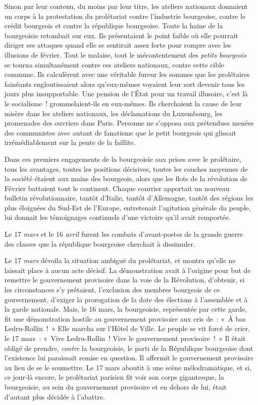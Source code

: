 \documentclass[french,twoside]{book} %
\begin{document}
Sinon par leur contenu, du moins par leur titre, les ateliers nationaux donnaient un corps à la protestation du prolétariat contre l’industrie bourgeoise, contre le crédit bourgeois et contre la république bourgeoise. Toute la haine de la bourgeoisie retombait sur eux. Ils présentaient le point faible où elle pourrait diriger ses attaques quand elle se sentirait assez forte pour rompre avec les illusions de février. Tout le malaise, tout le mécontentement des \emph{petits bourgeois} se tourna simultanément contre ces ateliers nationaux, contre cette cible commune. Ils calculèrent avec une véritable fureur les sommes que les prolétaires fainéants engloutissaient alors qu’eux-mêmes voyaient leur sort devenir tous les jours plus insupportable. Une pension de l’État pour un travail illusoire, c’est là le socialisme ! grommelaient-ils en eux-mêmes. Ils cherchaient la cause de leur misère dans les ateliers nationaux, les déclamations du Luxembourg, les promenades des ouvriers dans Paris. Personne ne s’opposa aux prétendues menées des communistes avec autant de fanatisme que le petit bourgeois qui glissait irrémédiablement sur la pente de la faillite.\par
Dans ces premiers engagements de la bourgeoisie aux prises avec le prolétaire, tous les avantages, toutes les positions décisives, toutes les couches moyennes de la société étaient aux mains des bourgeois, alors que les flots de la révolution de Février battaient tout le continent. Chaque courrier apportait un nouveau bulletin révolutionnaire, tantôt d’Italie, tantôt d’Allemagne, tantôt des régions les plus éloignées du Sud-Est de l’Europe, entretenait l’agitation générale du peuple, lui donnait les témoignages continuels d’une victoire qu’il avait remportée.\par
Le 17 \emph{mars} et le 16 \emph{avril} furent les combats d’avant-postes de la grande guerre des classes que la république bourgeoise cherchait à dissimuler.\par
Le 17 \emph{mars} dévoila la situation ambiguë du prolétariat, et montra qu’elle ne laissait place à aucun acte décisif. La démonstration avait à l’origine pour but de remettre le gouvernement provisoire dans la voie de la Révolution, d’obtenir, si les circonstances s’y prêtaient, l’exclusion des membres bourgeois de ce gouvernement, d’exiger la prorogation de la date des élections à l’assemblée et à la garde nationale. Mais, le 16 mars, la bourgeoisie, représentée par cette garde, fit une démonstration hostile au gouvernement provisoire aux cris de : « À bas Ledru-Rollin ! » Elle marcha sur l’Hôtel de Ville. Le peuple se vit forcé de crier, le 17 mars : « Vive Ledru-Rollin ! Vive le gouvernement provisoire ! » Il était obligé de prendre, \emph{contre} la bourgeoisie, le parti de la République bourgeoise dont l’existence lui paraissait remise en question. Il affermit le gouvernement provisoire au lieu de se le soumettre. Le 17 mars aboutit à une scène mélodramatique, et si, ce jour-là encore, le prolétariat parisien fit voir son corps gigantesque, la bourgeoisie, au sein du gouvernement provisoire et en dehors de lui, était d’autant plus décidée à l’abattre.\par
\end{document}
